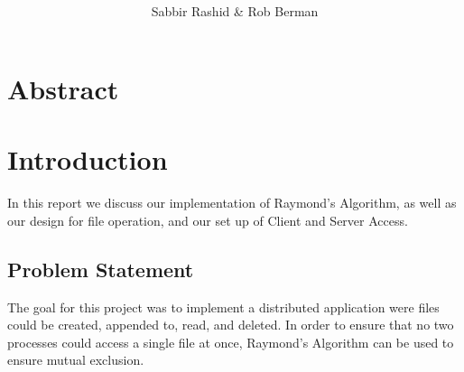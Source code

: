 \documentclass{article}
\title{
\textmd{\textbf{\ProjectTitle}}\\
\author{
	Sabbir Rashid \& Rob Berman\\
	\bf{\Institution}}
	\date{} %
}
\begin{document}

\setlength{\parindent}{8ex}

\tableofcontents
\newpage
\maketitle
\section{Abstract}
\label{sec:Abstract}
\textit{}
\section{Introduction}
\label{sec:Introduction}
In this report we discuss our implementation of Raymond's Algorithm, as well as our design for file operation, and our set up of Client and Server Access.
	\subsection{Problem Statement}
	\label{subsec:ProblemStatement}
	The goal for this project was to implement a distributed application were files could be created, appended to, read, and deleted. In order to ensure that no two processes could access a single file at once, Raymond's Algorithm can be used to ensure mutual exclusion.
\end{document}
